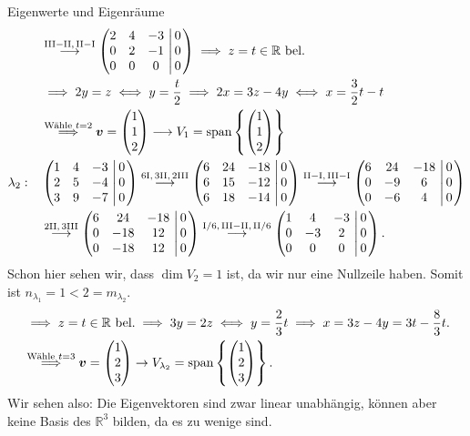 \begin{Beispiel}{Eigenwerte und Eigenräume}
\begin{align*}
&\overset{\text{III}-\text{II},\,\text{II}-\text{I}}{\longrightarrow}\left(\begin{matrix}2&4&-3\\0&2&-1\\0&0&0\end{matrix}\,\left|\,\begin{matrix}0\\0\\0\end{matrix}\right.\right)\implies z=t\in\mathbb{R}\text{ bel.}\\
&\implies 2y=z\iff y=\frac{t}{2}\implies 2x=3z-4y\iff x=\frac{3}{2}t-t\\
&\overset{\text{Wähle }t=2}{\implies} {\text{\boldmath${v}$}}=\begin{pmatrix}1\\1\\2\end{pmatrix}\longrightarrow V_1=\text{span}\left\{\begin{pmatrix}1\\1\\2\end{pmatrix}\right\}\\
\lambda_2:\quad &\left(\begin{matrix}1&4&-3\\2&5&-4\\3&9&-7\end{matrix}\,\left|\,\begin{matrix}0\\0\\0\end{matrix}\right.\right)\overset{6\text{I},\,3\text{II},\,2\text{III}}{\longrightarrow}\left(\begin{matrix}6&24&-18\\6&15&-12\\6&18&-14\end{matrix}\,\left|\,\begin{matrix}0\\0\\0\end{matrix}\right.\right)\overset{\text{II}-\text{I},\,\text{III}-\text{I}}{\longrightarrow}\left(\begin{matrix}6&24&-18\\0&-9&6\\0&-6&4\end{matrix}\,\left|\,\begin{matrix}0\\0\\0\end{matrix}\right.\right)\\
&\overset{2\text{II},\,3\text{III}}{\longrightarrow}\left(\begin{matrix}6&24&-18\\0&-18&12\\0&-18&12\end{matrix}\,\left|\,\begin{matrix}0\\0\\0\end{matrix}\right.\right)\overset{\text{I}/6,\,\text{III}-\text{II},\, \text{II}/6}{\longrightarrow}\left(\begin{matrix}1&4&-3\\0&-3&2\\0&0&0\end{matrix}\,\left|\,\begin{matrix}0\\0\\0\end{matrix}\right.\right).
\end{align*}
Schon hier sehen wir, dass $\dim V_2=1$ ist, da wir nur eine Nullzeile haben. Somit ist $n_{\lambda_1}=1<2=m_{\lambda_2}$.
\begin{align*}
&\implies z=t\in\mathbb{R}\text{ bel.} \implies 3y=2z\iff y=\frac{2}{3}t\implies x=3z-4y=3t-\frac{8}{3}t.\\
&\overset{\text{Wähle }t=3}{\implies}{\text{\boldmath${v}$}}=\begin{pmatrix}1\\2\\3\end{pmatrix}\to V_{\lambda_2}=\text{span}\left\{\begin{pmatrix}1\\2\\3\end{pmatrix}\right\}.
\end{align*}
Wir sehen also: Die Eigenvektoren sind zwar linear unabhängig, können aber keine Basis des $\mathbb{R}^3$ bilden, da es zu wenige sind.
\end{Beispiel}


